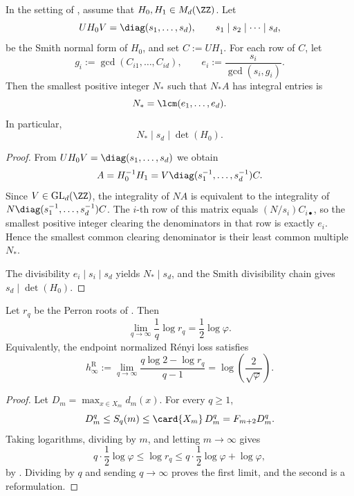 \begin{theorem}
\label{thm:smith-denominator}
In the setting of , assume that \(H_0,H_1\in
M_d(\ZZ)\).  Let
\[
  UH_0V=\diag(s_1,\dots,s_d),
  \qquad
  s_1\mid s_2\mid\cdots\mid s_d,
\]
be the Smith normal form of \(H_0\), and set \(C:=UH_1\).  For each row of
\(C\), let
\[
  g_i:=\gcd(C_{i1},\dots,C_{id}),
  \qquad
  e_i:=\frac{s_i}{\gcd(s_i,g_i)}.
\]
Then the smallest positive integer \(N_*\) such that \(N_*A\) has integral
entries is
\[
  N_* = \lcm(e_1,\dots,e_d).
\]
In particular,
\[
  N_*\mid s_d\mid \det(H_0).
\]
\end{theorem}

\begin{proof}
From \(UH_0V=\diag(s_1,\dots,s_d)\) we obtain
\[
  A=H_0^{-1}H_1=V\diag(s_1^{-1},\dots,s_d^{-1})C.
\]
Since \(V\in\mathrm{GL}_d(\ZZ)\), the integrality of \(NA\) is equivalent to the
integrality of \(N\diag(s_1^{-1},\dots,s_d^{-1})C\).  The \(i\)-th row of this
matrix equals \((N/s_i)C_{i\bullet}\), so the smallest positive integer clearing
the denominators in that row is exactly \(e_i\).  Hence the smallest common
clearing denominator is their least common multiple \(N_*\).

The divisibility \(e_i\mid s_i\mid s_d\) yields \(N_*\mid s_d\), and the Smith
divisibility chain gives \(s_d\mid\det(H_0)\).
\end{proof}

\begin{corollary}
\label{cor:renyi-endpoint}
Let \(r_q\) be the Perron roots of .  Then
\[
  \lim_{q\to\infty}\frac{1}{q}\log r_q = \frac12\log\varphi.
\]
Equivalently, the endpoint normalized R\'enyi loss satisfies
\[
  h_\infty^{\mathrm R}:=\lim_{q\to\infty}
  \frac{q\log 2-\log r_q}{q-1}
  =\log\left(\frac{2}{\sqrt{\varphi}}\right).
\]
\end{corollary}

\begin{proof}
Let \(D_m=\max_{x\in X_m}d_m(x)\).  For every \(q\ge 1\),
\[
  D_m^q\le S_q(m)\le \card{X_m}\,D_m^q=F_{m+2}D_m^q.
\]
Taking logarithms, dividing by \(m\), and letting \(m\to\infty\) gives
\[
  q\cdot\frac12\log\varphi
  \le \log r_q
  \le q\cdot\frac12\log\varphi+\log\varphi,
\]
by .  Dividing by \(q\) and sending
\(q\to\infty\) proves the first limit, and the second is a reformulation.
\end{proof}

